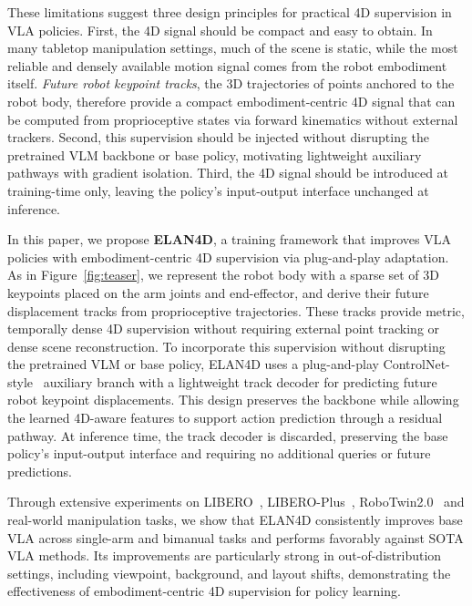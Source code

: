 These limitations suggest three design principles for practical 4D supervision in VLA policies.  First, the 4D signal should be compact and easy to obtain. In many tabletop manipulation settings, much of the scene is static, while the most reliable and densely available motion signal comes from the robot embodiment itself. \emph{Future robot keypoint tracks}, the 3D trajectories of points anchored to the robot body, therefore provide a compact embodiment-centric 4D signal that can be computed from proprioceptive states via forward kinematics without external trackers. Second, this supervision should be injected without disrupting the pretrained VLM backbone or base policy, motivating lightweight auxiliary pathways with gradient isolation. Third, the 4D signal should be introduced at training-time only, leaving the policy's input-output interface unchanged at inference.

In this paper, we propose \textbf{ELAN4D}, a training framework that improves VLA policies with embodiment-centric 4D supervision via plug-and-play adaptation. As in Figure~\ref{fig:teaser}, we represent the robot body with a sparse set of 3D keypoints placed on the arm joints and end-effector, and derive their future displacement tracks from proprioceptive trajectories. These tracks provide metric, temporally dense 4D supervision without requiring external point tracking or dense scene reconstruction. To incorporate this supervision without disrupting the pretrained VLM or base policy, ELAN4D uses a plug-and-play ControlNet-style~\citep{zhang2023controlnet} auxiliary branch with a lightweight track decoder for predicting future robot keypoint displacements. This design preserves the backbone while allowing the learned 4D-aware features to support action prediction through a residual pathway. At inference time, the track decoder is discarded, preserving the base policy's input-output interface and requiring no additional queries or future predictions.

Through extensive experiments on LIBERO~\citep{liu2023libero}, LIBERO-Plus~\citep{fei2025liberoplus}, RoboTwin2.0~\citep{chen2025robotwin} and real-world manipulation tasks, we show that ELAN4D consistently improves base VLA across single-arm and bimanual tasks and performs favorably against SOTA VLA methods. Its improvements are particularly strong in out-of-distribution settings, including viewpoint, background, and layout shifts, demonstrating the effectiveness of embodiment-centric 4D supervision for policy learning.


